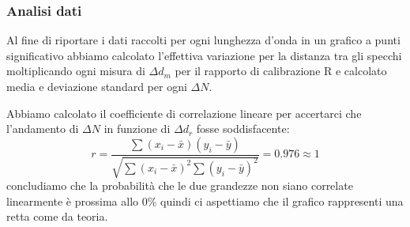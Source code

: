 \documentclass{article}
\theoremstyle{definition}
\begin{document}
\subsubsection{Analisi dati}
Al fine di riportare i dati raccolti per ogni lunghezza d'onda in un grafico a punti significativo abbiamo calcolato l'effettiva variazione per la distanza tra gli specchi  moltiplicando ogni misura di $\Delta d_{m}$ per il rapporto di calibrazione R e calcolato media e deviazione standard per ogni $\Delta N$.\\

\begin{figure}[!htbp]
    	\captionsetup{labelformat=empty}
    \end{figure}
Abbiamo calcolato il coefficiente di correlazione lineare per accertarci che l'andamento di \(\Delta N\) in funzione di \(\Delta d_{r}\) fosse soddisfacente:
\[r = \frac{\sum (x_{i} - \bar{x})(y_{i} - \bar{y})}{\sqrt{\sum (x_{i} - \bar{x})^{2}\sum (y_{i} - \bar{y})^{2}}} = 0.976 \approx 1 \]
concludiamo che la probabilità che le due grandezze non siano correlate linearmente è prossima allo 0\% quindi ci aspettiamo che il grafico rappresenti una retta come da teoria.
\pagebreak
\end{document}
